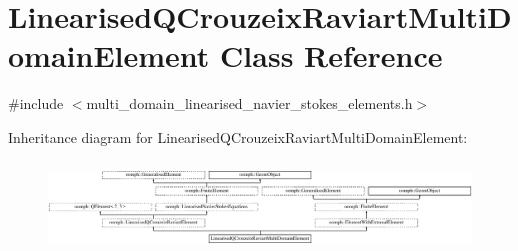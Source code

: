 \hypertarget{classLinearisedQCrouzeixRaviartMultiDomainElement}{}\section{Linearised\+Q\+Crouzeix\+Raviart\+Multi\+Domain\+Element Class Reference}
\label{classLinearisedQCrouzeixRaviartMultiDomainElement}


{\ttfamily \#include $<$multi\+\_\+domain\+\_\+linearised\+\_\+navier\+\_\+stokes\+\_\+elements.\+h$>$}

Inheritance diagram for Linearised\+Q\+Crouzeix\+Raviart\+Multi\+Domain\+Element\+:\begin{figure}[H]
\begin{center}
\leavevmode
\includegraphics[height=2.397260cm]{classLinearisedQCrouzeixRaviartMultiDomainElement}
\end{center}
\end{figure}
